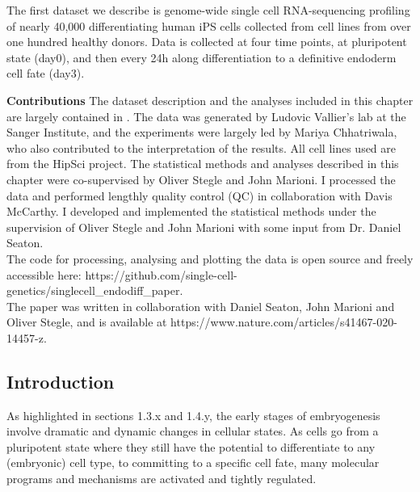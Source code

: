The first dataset we describe is genome-wide single cell RNA-sequencing profiling of nearly 40,000 differentiating human iPS cells collected from cell lines from over one hundred healthy donors. 
Data is collected at four time points, at pluripotent state (day0), and then every 24h along differentiation to a definitive endoderm cell fate (day3).
\newpage
\begin{Abstract}
\hspace{-3mm}\textbf{Contributions} The dataset description and the analyses included in this chapter are largely contained in \cite{cuomo2020single}. The data was generated by Ludovic Vallier’s lab at the Sanger Institute, and the experiments were largely led by Mariya Chhatriwala, who also contributed to the interpretation of the results. 
All cell lines used are from the HipSci project.
The statistical methods and analyses described in this chapter were co-supervised by Oliver Stegle and John Marioni. 
I processed the data and performed lengthly quality control (QC) in collaboration with Davis McCarthy. 
I developed and implemented the statistical methods under the supervision of Oliver Stegle and John Marioni with some input from Dr. Daniel  Seaton.\\

The code for processing, analysing and plotting the data is open source and freely accessible here: https://github.com/single-cell-genetics/singlecell\_endodiff\_paper.\\ 

The paper was written in collaboration with Daniel Seaton, John Marioni and Oliver Stegle, and is available at https://www.nature.com/articles/s41467-020-14457-z.
\vfill
\end{Abstract}

\subsection{Introduction}

As highlighted in sections 1.3.x and 1.4.y, the early stages of embryogenesis involve dramatic and dynamic changes in cellular states. 
As cells go from a pluripotent state where they still have the potential to differentiate to any (embryonic) cell type, to committing to a specific cell fate, many molecular programs and mechanisms are activated and tightly regulated.

